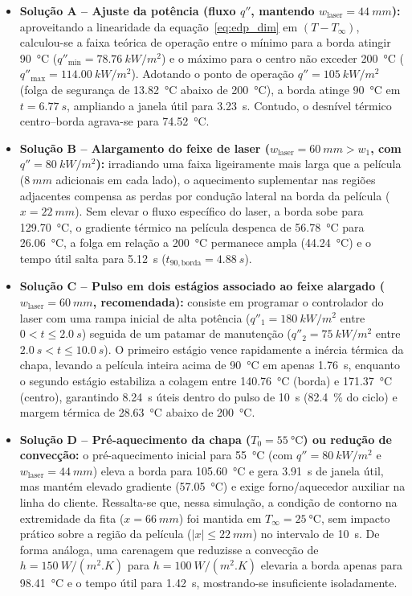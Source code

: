 \documentclass[11pt,a4paper]{article}
\begin{document}
\begin{itemize}
    \item \textbf{Solução A -- Ajuste da potência (fluxo $q''$, mantendo $w_{\text{laser}} = \SI{44}{mm}$):} aproveitando a linearidade da equação~\eqref{eq:edp_dim} em $(T - T_\infty)$, calculou-se a faixa teórica de operação entre o mínimo para a borda atingir \SI{90}{\celsius} ($q''_{\min} = \SI{78,76}{kW/m^2}$) e o máximo para o centro não exceder \SI{200}{\celsius} ($q''_{\max} = \SI{114,00}{kW/m^2}$). Adotando o ponto de operação $q'' = \SI{105}{kW/m^2}$ (folga de segurança de \SI{13,82}{\celsius} abaixo de \SI{200}{\celsius}), a borda atinge \SI{90}{\celsius} em $t = \SI{6,77}{s}$, ampliando a janela útil para \SI{3,23}{s}. Contudo, o desnível térmico centro--borda agrava-se para \SI{74,52}{\celsius}.
    \item \textbf{Solução B -- Alargamento do feixe de laser ($w_{\text{laser}} = \SI{60}{mm} > w_1$, com $q'' = \SI{80}{kW/m^2}$):} irradiando uma faixa ligeiramente mais larga que a película ($\SI{8}{mm}$ adicionais em cada lado), o aquecimento suplementar nas regiões adjacentes compensa as perdas por condução lateral na borda da película ($x = \SI{22}{mm}$). Sem elevar o fluxo específico do laser, a borda sobe para \SI{129,70}{\celsius}, o gradiente térmico na película despenca de \SI{56,78}{\celsius} para \SI{26,06}{\celsius}, a folga em relação a \SI{200}{\celsius} permanece ampla (\SI{44,24}{\celsius}) e o tempo útil salta para \SI{5,12}{s} ($t_{90,\text{borda}} = \SI{4,88}{s}$).
    \item \textbf{Solução C -- Pulso em dois estágios associado ao feixe alargado ($w_{\text{laser}} = \SI{60}{mm}$, recomendada):} consiste em programar o controlador do laser com uma rampa inicial de alta potência ($q''_1 = \SI{180}{kW/m^2}$ entre $0 < t \le \SI{2,0}{s}$) seguida de um patamar de manutenção ($q''_2 = \SI{75}{kW/m^2}$ entre $\SI{2,0}{s} < t \le \SI{10,0}{s}$). O primeiro estágio vence rapidamente a inércia térmica da chapa, levando a película inteira acima de \SI{90}{\celsius} em apenas \SI{1,76}{s}, enquanto o segundo estágio estabiliza a colagem entre \SI{140,76}{\celsius} (borda) e \SI{171,37}{\celsius} (centro), garantindo \SI{8,24}{s} úteis dentro do pulso de \SI{10}{s} (\SI{82,4}{\percent} do ciclo) e margem térmica de \SI{28,63}{\celsius} abaixo de \SI{200}{\celsius}.
    \item \textbf{Solução D -- Pré-aquecimento da chapa ($T_0 = \SI{55}{\celsius}$) ou redução de convecção:} o pré-aquecimento inicial para \SI{55}{\celsius} (com $q'' = \SI{80}{kW/m^2}$ e $w_{\text{laser}} = \SI{44}{mm}$) eleva a borda para \SI{105,60}{\celsius} e gera \SI{3,91}{s} de janela útil, mas mantém elevado gradiente (\SI{57,05}{\celsius}) e exige forno/aquecedor auxiliar na linha do cliente. Ressalta-se que, nessa simulação, a condição de contorno na extremidade da fita ($x = \SI{66}{mm}$) foi mantida em $T_\infty = \SI{25}{\celsius}$, sem impacto prático sobre a região da película ($|x| \le \SI{22}{mm}$) no intervalo de \SI{10}{s}. De forma análoga, uma carenagem que reduzisse a convecção de $h = \SI{150}{W/(m^2.K)}$ para $h = \SI{100}{W/(m^2.K)}$ elevaria a borda apenas para \SI{98,41}{\celsius} e o tempo útil para \SI{1,42}{s}, mostrando-se insuficiente isoladamente.

\end{itemize}
\end{document}
